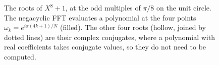 \begin{figure}[!htb]
\centering

\caption{The roots of $X^8+1$, at the odd multiples of $\pi/8$ on the unit
circle. The negacyclic FFT evaluates a polynomial at the four points
$\omega_k=e^{i\pi(4k+1)/N}$ (filled). The other four roots (hollow, joined by
dotted lines) are their complex conjugates, where a polynomial with real
coefficients takes conjugate values, so they do not need to be computed.}
\label{fig:roots}
\end{figure}
